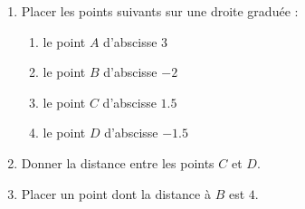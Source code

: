 
\begin{exercice}\label{exo2smath-0161}
\let\Oldtheenumi\theenumi
\let\Oldtheenumii\theenumii
\renewcommand{\theenumi}{(\arabic{enumi})}
\renewcommand{\theenumii}{(\alph{enumii})}

\begin{enumerate}
    \item
        
Placer les points suivants sur une droite graduée :
\begin{multicols}{2}
\begin{enumerate}
    \item
        le point \( A\) d'abscisse \( 3\)
    \item
        le point \( B\) d'abscisse \( -2\)
    \item
        le point \( C\) d'abscisse \( 1.5\)
    \item
        le point \( D\) d'abscisse \( -1.5\)
\end{enumerate}
\end{multicols}
\item
Donner la distance entre les points \( C\) et \( D\).
\item\label{ItemBRMGooQoNoou}
    Placer un point dont la distance à \( B\) est \( 4\).
\end{enumerate}

\let\theenumi\Oldtheenumi
\let\theenumii\Oldtheenumii
{}
\end{exercice}
